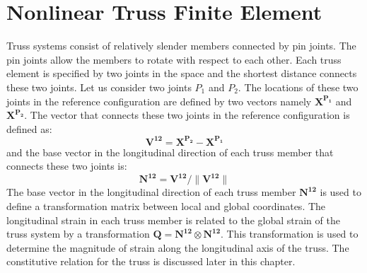 \section{Nonlinear Truss Finite Element}
Truss systems consist of relatively slender members connected by pin joints.
The pin joints allow the members to rotate with respect to each other.
Each truss element is specified by two joints in the space and the shortest distance connects these two joints.
Let us consider two joints $P_1$ and $P_2$.
The locations of these two joints in the reference configuration are defined by two vectors namely $\mathbf {X^{P_1}}$ and $\mathbf {X^{P_2}}$.
The vector that connects these two joints in the reference configuration is defined as:
\begin{equation}
\mathbf {V^{12}=X^{P_2}-X^{P_1} } 
\end{equation}
and the base vector in the longitudinal direction of each truss member that connects these two joints is: 
\begin{equation}
\mathbf {N^{12}=V^{12}/ \|V^{12}\| }
\label{base_vector_definition}
\end{equation}
The base vector in the longitudinal direction of each truss member $\mathbf {N^{12}}$ is used to define a transformation matrix between local and global coordinates.
The longitudinal strain in each truss member is related to the global strain of the truss system by a transformation $ \mathbf {Q}=\mathbf {N^{12}} \otimes \mathbf{N^{12} }$. 
This transformation is used to determine the magnitude of strain along the longitudinal axis of the truss.
The constitutive relation for the truss is discussed later in this chapter.

